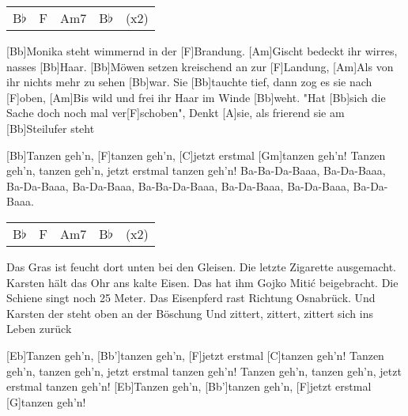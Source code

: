 

\begin{guitar}
	 {\footnotesize\begin{tabular}{l|l|l|l l}
			B$\flat$ & F & Am7 & B$\flat$ & (x2)
	\end{tabular}}\vspace{-0.1em}

	[Bb]Monika steht wimmernd in der [F]Brandung.
	[Am]Gischt bedeckt ihr wirres, nasses [Bb]Haar.
	[Bb]Möwen setzen kreischend an zur [F]Landung,
	[Am]Als von ihr nichts mehr zu sehen [Bb]war.
	Sie [Bb]tauchte tief, dann zog es sie nach [F]oben,
	[Am]Bis wild und frei ihr Haar im Winde [Bb]weht.
	"Hat [Bb]sich die Sache doch noch mal ver[F]schoben",
	Denkt [A]sie, als frierend sie am [Bb]Steilufer steht\vspace{-0.1em}
	
	[Bb]Tanzen geh'n, [F]tanzen geh'n, [C]jetzt erstmal [Gm]tanzen geh'n!
	Tanzen geh'n, tanzen geh'n, jetzt erstmal tanzen geh'n!
	Ba-Ba-Da-Baaa, Ba-Da-Baaa, Ba-Da-Baaa, Ba-Da-Baaa,
	Ba-Ba-Da-Baaa, Ba-Da-Baaa, Ba-Da-Baaa, Ba-Da-Baaa.\vspace{-0.1em}
	
	 {\footnotesize\begin{tabular}{l|l|l|l l}
			B$\flat$ & F & Am7 & B$\flat$ & (x2)
	\end{tabular}}\vspace{-0.1em}
	
	Das Gras ist feucht dort unten bei den Gleisen.
	Die letzte Zigarette ausgemacht.
	Karsten hält das Ohr ans kalte Eisen.
	Das hat ihm Gojko Mitić beigebracht.
	Die Schiene singt noch 25 Meter.
	Das Eisenpferd rast Richtung Osnabrück.
	Und Karsten der steht oben an der Böschung
	Und zittert, zittert, zittert sich ins Leben zurück\vspace{-0.1em}
	
	 \vspace{-0.1em}
	
	[Eb]Tanzen geh'n, [Bb']tanzen geh'n, [F]jetzt erstmal [C]tanzen geh'n!
	Tanzen geh'n, tanzen geh'n, jetzt erstmal tanzen geh'n!
	Tanzen geh'n, tanzen geh'n, jetzt erstmal tanzen geh'n!
	[Eb]Tanzen geh'n, [Bb']tanzen geh'n, [F]jetzt erstmal [G]tanzen geh'n!\vspace{-1em}
\end{guitar}